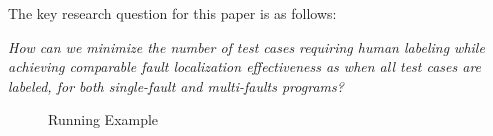 The key research question for this paper is as follows:

\noindent {} \hangindent=0.5cm {\it How can we minimize the number of test cases requiring human labeling while achieving comparable fault localization effectiveness as when all test cases are labeled, for both single-fault and multi-faults programs?}

\begin{figure}[!htbp]
  \centering
  \caption{Running Example}
  \label{fig:motiv-example}
\end{figure}

